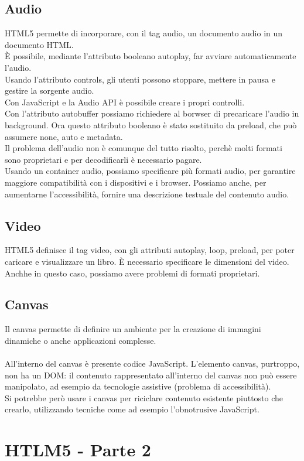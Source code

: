 \documentclass{article}
\begin{document}
\subsection{Audio}
HTML5 permette di incorporare, con il tag audio, un documento audio in un documento HTML. \\
È possibile, mediante l'attributo booleano autoplay, far avviare automaticamente l'audio.\\
Usando l'attributo controls, gli utenti possono stoppare, mettere in pausa e gestire la sorgente audio.\\
Con JavaScript e la Audio API è possibile creare i propri controlli.\\
Con l'attributo autobuffer possiamo richiedere al borwser di precaricare l'audio in background. Ora questo attributo booleano è stato sostituito da preload, che può assumere none, auto e metadata.\\
Il problema dell'audio non è comunque del tutto risolto, perchè molti formati sono proprietari e per decodificarli è necessario pagare.\\
Usando un container audio, possiamo specificare più formati audio, per garantire maggiore compatibilità con i dispositivi e i browser. Possiamo anche, per aumentarne l'accessibilità, fornire una descrizione testuale del contenuto audio.
\subsection{Video}
HTML5 definisce il tag video, con gli attributi autoplay, loop, preload, per poter caricare e visualizzare un libro. È necessario specificare le dimensioni del video. Anchhe in questo caso, possiamo avere problemi di formati proprietari.
\subsection{Canvas}
Il canvas permette di definire un ambiente per la creazione di immagini dinamiche o anche applicazioni complesse.\\\\
All'interno del canvas è presente codice JavaScript.
L'elemento canvas, purtroppo, non ha un DOM: il contenuto rappresentato all'interno del canvas non può essere manipolato, ad esempio da tecnologie assistive (problema di accessibilità).\\
Si potrebbe però usare i canvas per riciclare contenuto esistente piuttosto che crearlo, utilizzando tecniche come ad esempio l'obnotrusive JavaScript.
\section{HTLM5 - Parte 2}
\end{document}
